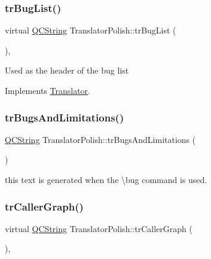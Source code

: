 \subsubsection{\texorpdfstring{trBugList()}{trBugList()}}
{\footnotesize\ttfamily virtual \mbox{\hyperlink{class_q_c_string}{Q\+C\+String}} Translator\+Polish\+::tr\+Bug\+List (\begin{DoxyParamCaption}{ }\end{DoxyParamCaption})\hspace{0.3cm}{\ttfamily [inline]}, {\ttfamily [virtual]}}

Used as the header of the bug list 

Implements \mbox{\hyperlink{class_translator}{Translator}}.

\mbox{\label{class_translator_polish_ab7054cfc596a6882e0d8e1911ead33a7}} 
\subsubsection{\texorpdfstring{trBugsAndLimitations()}{trBugsAndLimitations()}}
{\footnotesize\ttfamily \mbox{\hyperlink{class_q_c_string}{Q\+C\+String}} Translator\+Polish\+::tr\+Bugs\+And\+Limitations (\begin{DoxyParamCaption}{ }\end{DoxyParamCaption})\hspace{0.3cm}{\ttfamily [inline]}}

this text is generated when the \textbackslash{}bug command is used. \mbox{\label{class_translator_polish_aea28863a3d514eda308c9b6182a684a3}} 
\subsubsection{\texorpdfstring{trCallerGraph()}{trCallerGraph()}}
{\footnotesize\ttfamily virtual \mbox{\hyperlink{class_q_c_string}{Q\+C\+String}} Translator\+Polish\+::tr\+Caller\+Graph (\begin{DoxyParamCaption}{ }\end{DoxyParamCaption})\hspace{0.3cm}{\ttfamily [inline]}, {\ttfamily [virtual]}}

